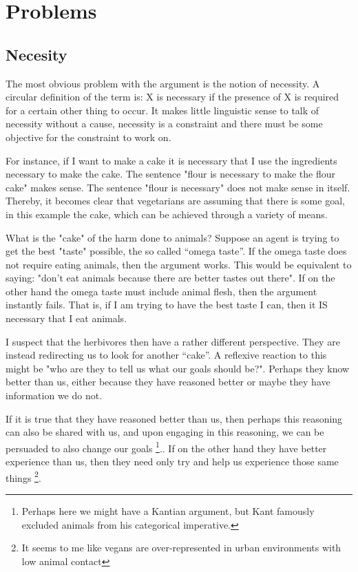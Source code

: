 

\section{Problems}

\subsection{Necesity}

The most obvious problem with the argument is the notion of necessity. A circular definition of the term is: X is necessary if the presence of X is required for a certain other thing to occur. It makes little linguistic sense to talk of necessity without a cause, necessity is a constraint and there must be some objective for the constraint to work on. %

For instance, if I want to make a cake it is necessary that I use the ingredients necessary to make the cake. The sentence "flour is necessary to make the flour cake" makes sense. The sentence "flour is necessary" does not make sense in itself. Thereby, it becomes clear that vegetarians are assuming that there is some goal, in this example the cake, which can be achieved through a variety of means. %

What is the "cake" of the harm done to animals? Suppose an agent is trying to get the best "taste" possible, the so called “omega taste”. If the omega taste does not require eating animals, then the argument works. This would be equivalent to saying: "don’t eat animals because there are better tastes out there". If on the other hand the omega taste must include animal flesh, then the argument instantly fails. That is, if I am trying to have the best taste I can, then it IS necessary that I eat animals.%

I suspect that the herbivores then have a rather different perspective. They are instead redirecting us to look for another “cake”. A reflexive reaction to this might be "who are they to tell us what our goals should be?". Perhaps they know better than us, either because they have reasoned better or maybe they have information we do not. 

If it is true that they have reasoned better than us, then perhaps this reasoning can also be shared with us, and upon engaging in this reasoning, we can be persuaded to also change our goals \footnote{ Perhaps here we might have a Kantian argument, but Kant famously excluded animals from his categorical imperative. }.. If on the other hand they have better experience than us, then they need only try and help us experience those same things \footnote{It seems to me like vegans are over-represented in urban environments with low animal contact }. 

